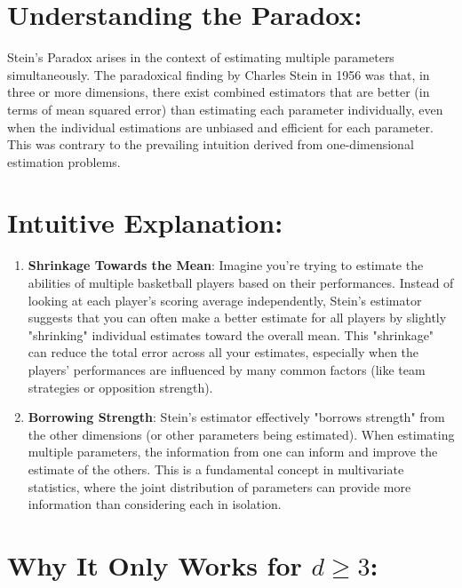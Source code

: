 \documentclass{article}
\begin{document}
\section*{Understanding the Paradox:}

Stein's Paradox arises in the context of estimating multiple parameters simultaneously. The paradoxical finding by Charles Stein in 1956 was that, in three or more dimensions, there exist combined estimators that are better (in terms of mean squared error) than estimating each parameter individually, even when the individual estimations are unbiased and efficient for each parameter. This was contrary to the prevailing intuition derived from one-dimensional estimation problems.

\section*{Intuitive Explanation:}

\begin{enumerate}
    \item \textbf{Shrinkage Towards the Mean}: Imagine you're trying to estimate the abilities of multiple basketball players based on their performances. Instead of looking at each player's scoring average independently, Stein's estimator suggests that you can often make a better estimate for all players by slightly "shrinking" individual estimates toward the overall mean. This "shrinkage" can reduce the total error across all your estimates, especially when the players' performances are influenced by many common factors (like team strategies or opposition strength).
    \item \textbf{Borrowing Strength}: Stein's estimator effectively "borrows strength" from the other dimensions (or other parameters being estimated). When estimating multiple parameters, the information from one can inform and improve the estimate of the others. This is a fundamental concept in multivariate statistics, where the joint distribution of parameters can provide more information than considering each in isolation.
\end{enumerate}

\section*{Why It Only Works for \(d \geq 3\):}
\end{document}

